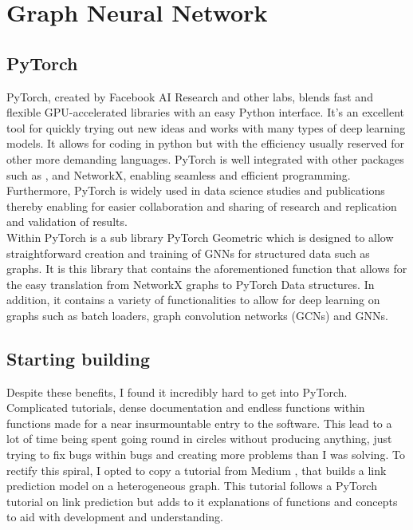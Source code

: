 \documentclass{l4proj}
\begin{document}
\section{Graph Neural Network}

\subsection{PyTorch}

PyTorch, created by Facebook AI Research and other labs, blends fast and flexible GPU-accelerated libraries with an easy Python interface. It's an excellent tool for quickly trying out new ideas and works with many types of deep learning models. It allows for coding in python but with the efficiency usually reserved for other more demanding languages. PyTorch is well integrated with other packages such as \cite{scipy}, \cite{numpy} and NetworkX, enabling seamless and efficient programming. Furthermore, PyTorch is widely used in data science studies and publications thereby enabling for easier collaboration and sharing of research and replication and validation of results. \\

Within PyTorch is a sub library PyTorch Geometric which is designed to allow straightforward creation and training of GNNs for structured data such as graphs. It is this library that contains the aforementioned function that allows for the easy translation from NetworkX graphs to PyTorch Data structures. In addition, it contains a variety of functionalities to allow for deep learning on graphs such as batch loaders, graph convolution networks (GCNs) and GNNs. \\

\subsection{Starting building}

Despite these benefits, I found it incredibly hard to get into PyTorch. Complicated tutorials, dense documentation and endless functions within functions made for a near insurmountable entry to the software. This lead to a lot of time being spent going round in circles without producing anything, just trying to fix bugs within bugs and creating more problems than I was solving. To rectify this spiral, I opted to copy a tutorial from Medium \citep{gnn_tutorial}, that builds a link prediction model on a heterogeneous graph. This tutorial follows a PyTorch tutorial on link prediction but adds to it explanations of functions and concepts to aid with development and understanding. \\
\end{document}
